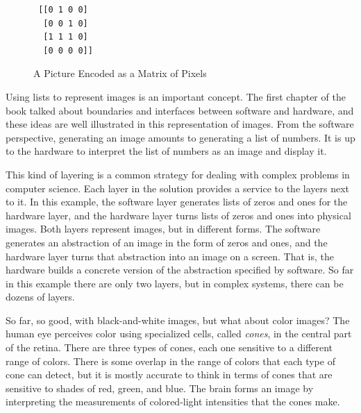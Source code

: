 \begin{figure}
\begin{center}
\begin{minipage}{3cm}
\begin{code}
\begin{verbatim}
 [[0 1 0 0]
  [0 0 1 0]
  [1 1 1 0]
  [0 0 0 0]]
\end{verbatim}
\end{code}
\end{minipage}%
\begin{minipage}{3cm}
\end{minipage}
\end{center}
\caption{A Picture Encoded as a Matrix of Pixels}
\label{fig:glider-in-images}
\end{figure}

Using lists to represent images is an important concept.
The first chapter of the book talked about boundaries
and interfaces between software and hardware, and these ideas are
well illustrated in this representation of images.
From the software perspective,
generating an image amounts to generating a list of numbers.
It is up to the hardware to interpret the list of numbers
as an image and display it.

This kind of layering is a common strategy for dealing
with complex problems in computer science.
Each layer in the solution provides a service
to the layers next to it. In this example,
the software layer generates lists of zeros and ones
for the hardware layer, and
the hardware layer turns lists of zeros and ones into physical images.
Both layers represent images, but in different forms.
The software generates an abstraction of an image
in the form of zeros and ones,
and the hardware layer turns that abstraction into an
image on a screen. That is, the hardware builds a
concrete version of the abstraction specified by software.
So far in this example there are only two layers,
but in complex systems, there can be dozens of layers.

So far, so good, with black-and-white images,
but what about color images?
The human eye perceives
color using specialized cells, called \emph{cones}, in the central
part of the retina. There are three types of cones, each one sensitive
to a different range of colors. There is some overlap in the range
of colors that each type of cone can detect, but it is mostly accurate
to think in terms of cones that are sensitive to shades of red, green,
and blue. The brain forms an image by interpreting
the measurements of colored-light intensities that the cones make.

